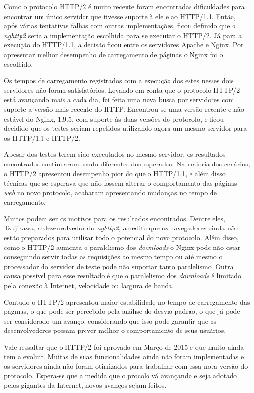 Como o protocolo HTTP/2 é muito recente foram encontradas dificuldades para encontrar um único servidor que tivesse suporte à ele e ao HTTP/1.1. Então, após várias tentativas falhas com outras implementações, ficou definido que o \textit{nghttp2} seria a implementação escolhida para se executar o HTTP/2. Já para a execução do HTTP/1.1, a decisão ficou entre os servidores Apache e Nginx. Por apresentar melhor desempenho de carregamento de páginas o Nginx foi o escolhido.

Os tempos de carregamento registrados com a execução dos estes nesses dois servidores não foram satisfatórios. Levando em conta que o protocolo HTTP/2 está avançando mais a cada dia, foi feita uma nova busca por servidores com suporte a versão mais recente do HTTP. Encontrou-se uma versão recente e não-estável do Nginx, 1.9.5, com suporte às duas versões do protocolo, e ficou decidido que os testes seriam repetidos utilizando agora um mesmo servidor para os HTTP/1.1 e HTTP/2.

Apesar dos testes terem sido executados no mesmo servidor, os resultados encontrados continuaram sendo diferentes dos esperados. Na maioria dos cenários, o HTTP/2 apresentou desempenho pior do que o HTTP/1.1, e além disso técnicas que se esperava que não fossem alterar o comportamento das páginas \textit{web} no novo protocolo, acabaram apresentando mudanças no tempo de carregamento.

Muitos podem ser os motivos para os resultados encontrados. Dentre eles, Tsujikawa, o desenvolvedor do \textit{nghttp2}, acredita que os navegadores ainda não estão preparados para utilizar todo o potencial do novo protocolo. Além disso, como o HTTP/2 aumenta o paralelismo dos \textit{downloads} o Nginx pode não estar conseguindo servir todas as requisições ao mesmo tempo ou até mesmo o processador do servidor de teste pode não suportar tanto paralelismo. Outra causa possível para esse resultado é que o paralelismo dos \textit{downloads} é limitado pela conexão à Internet, velocidade ou largura de banda.

Contudo o HTTP/2 apresentou maior estabilidade no tempo de carregamento das páginas, o que pode ser percebido pela análise do desvio padrão, o que já pode ser considerado um avanço, considerando que isso pode garantir que os desenvolvedores possam prever melhor o comportamento de seus usuários.

Vale ressaltar que o HTTP/2 foi aprovado em Março de 2015 e que muito ainda tem a evoluir. Muitas de suas funcionalidades ainda não foram implementadas e os servidores ainda não foram otimizados para trabalhar com essa nova versão do protocolo. Espera-se que a medida que o procolo vá avançando e seja adotado pelos gigantes da Internet, novos avanços sejam feitos.


